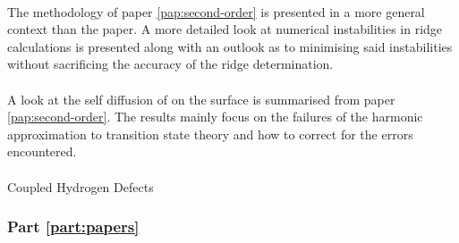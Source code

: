 \paragraph{}
The methodology of paper \ref{pap:second-order} is presented in a more general context than the paper.
A more detailed look at numerical instabilities in ridge calculations is presented along with an outlook as to minimising said instabilities without sacrificing the accuracy of the ridge determination.

\paragraph{}
A look at the self diffusion of  on the  surface is summarised from paper \ref{pap:second-order}.
The results mainly focus on the failures of the harmonic approximation to transition state theory and how to correct for the errors encountered.

\paragraph{}
Coupled Hydrogen Defects \expand

\subsubsection{Part \ref{part:papers}}
\placeholder
